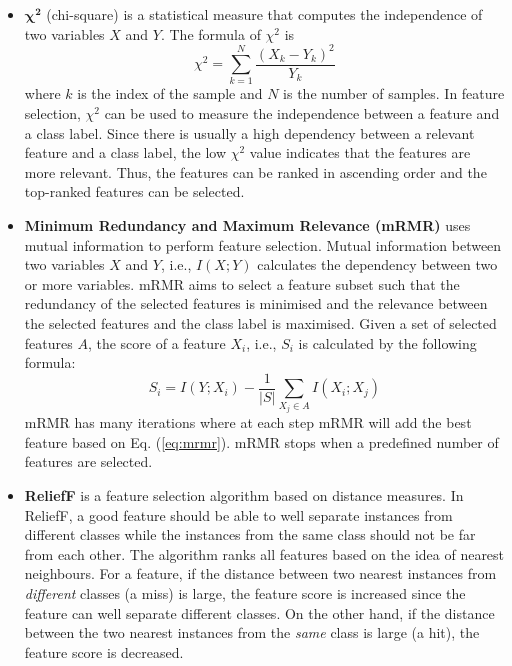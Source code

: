 \documentclass[runningheads]{llncs}
\begin{document}
\begin{itemize}
	\item $\boldsymbol{\chi^2}$ (chi-square) \cite{liu1995chi2} is a statistical measure that computes the independence of two variables $X$ and $Y$. The formula of $\chi^2$ is
	\begin{equation}
	\chi^2 = \sum_{k=1}^N \frac{(X_{k} - Y_{k})^2}{Y_{k}}
	\label{eq:chi}
	\end{equation}
	where $k$ is the index of the sample and $N$ is the number of samples. 
	In feature selection, $\chi^2$ can be used to measure the independence between a feature and a class label. 
	Since there is usually a high dependency between a relevant feature and a class label, the low $\chi^2$ value indicates that the features are more relevant. 
	Thus, the features can be ranked in ascending order and the top-ranked features can be selected. 
	\item \textbf{Minimum Redundancy and Maximum Relevance (mRMR)} \cite{ding2005minimum} uses mutual information to perform feature selection. 
	Mutual information between two variables $X$ and $Y$, i.e., $I(X; Y)$ calculates the dependency between two or more variables. 
	mRMR aims to select a feature subset such that the redundancy of the selected features is minimised and the relevance between the selected features and the class label is maximised. 
	Given a set of selected features $A$, the score of a feature $X_i$, i.e., $S_i$ is calculated by the following formula:
	\begin{equation}
	S_i = I(Y; X_i) - \frac{1}{|S|} \sum_{X_j \in A} I(X_i; X_j) 
	\label{eq:mrmr}
	\end{equation}  
    mRMR has many iterations where at each step mRMR will add the best feature based on Eq. (\ref{eq:mrmr}). 
    mRMR stops when a predefined number of features are selected. 
	\item \textbf{ReliefF} \cite{robnik2003theoretical} is a feature selection algorithm based on distance measures. 
	In ReliefF, a good feature should be able to well separate instances from different classes while the instances from the same class should not be far from each other. 
	The algorithm ranks all features based on the idea of nearest neighbours. 
	For a feature, if the distance between two nearest instances from \textit{different} classes (a miss) is large, the feature score is increased since the feature can well separate different classes. 
	On the other hand, if the distance between the two nearest instances from the \textit{same} class is large (a hit), the feature score is decreased. 

\end{itemize}
\end{document}
